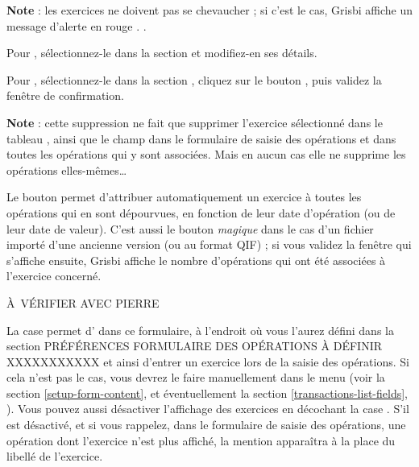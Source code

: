 \textbf{Note} : les exercices ne doivent pas se chevaucher ; si c'est le cas, Grisbi affiche un message d'alerte en rouge{\couleur} \ifIllustration {}.
\else .
\fi

Pour , sélectionnez-le dans la section  et modifiez-en ses détails.

Pour , sélectionnez-le dans la section , cliquez sur le bouton , puis validez la fenêtre de confirmation. 

\textbf{Note} : cette suppression ne fait que supprimer l'exercice sélectionné dans le tableau , ainsi que le champ  dans le formulaire de saisie des opérations et dans toutes les opérations qui y sont associées. Mais en aucun cas elle ne supprime les opérations elles-mêmes\ldots

Le bouton  permet d'attribuer automatiquement un exercice à toutes les opérations qui en sont dépourvues, en fonction de leur date d'opération (ou de leur date de valeur). C'est aussi le bouton \emph{magique} dans le cas d'un fichier importé d'une ancienne version (ou au format QIF) ; si vous validez la fenêtre qui s'affiche ensuite, Grisbi affiche le nombre d'opérations qui ont été associées à l'exercice concerné.


À VÉRIFIER AVEC PIERRE

La case  permet d' dans ce formulaire, à l'endroit où vous l'aurez défini dans la section PRÉFÉRENCES FORMULAIRE DES  OPÉRATIONS À DÉFINIR XXXXXXXXXXX et ainsi d'entrer un exercice lors de la saisie des opérations. Si cela n'est pas le cas, vous devrez le faire manuellement dans le menu  (voir la section \vref{setup-form-content},  et éventuellement la section \vref{transactions-list-fields}, ).
Vous pouvez aussi désactiver l'affichage des exercices en décochant la case .
S'il est désactivé, et si vous rappelez, dans le formulaire de saisie des opérations, une opération dont l'exercice n'est plus affiché, la mention  apparaîtra à la place du libellé de l'exercice.

